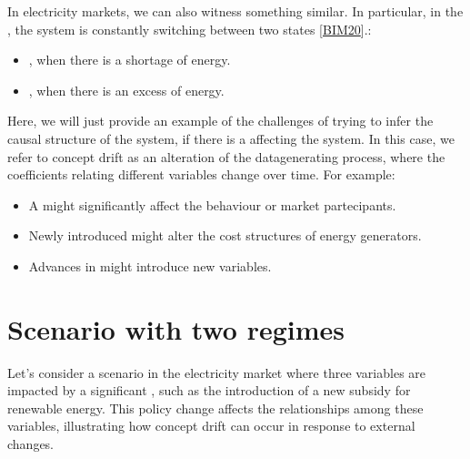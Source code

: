 \documentclass[letterpaper,10pt,english]{jupyterBook}
\begin{document}
\sphinxAtStartPar
In electricity markets, we can also witness something similar. In particular, in the , the system is constantly switching between two states {[}\hyperlink{cite.bibliography:id8}{BIM20}{]}.:
\begin{itemize}
\item {} 
\sphinxAtStartPar
{}, when there is a shortage of energy.

\item {} 
\sphinxAtStartPar
{}, when there is an excess of energy.

\end{itemize}

\sphinxAtStartPar
Here, we will just provide an example of the challenges of trying to infer the causal structure of the system, if there is a  affecting the system. In this case, we refer to concept drift as an alteration of the data\sphinxhyphen{}generating process, where the coefficients relating different variables change over time. For example:
\begin{itemize}
\item {} 
\sphinxAtStartPar
A  might significantly affect the behaviour or market partecipants.

\item {} 
\sphinxAtStartPar
Newly introduced  might alter the cost structures of energy generators.

\item {} 
\sphinxAtStartPar
Advances in  might introduce new variables.

\end{itemize}


\section{Scenario with two regimes}
\label{\detokenize{notebooks/structural_breaks_example:scenario-with-two-regimes}}
\sphinxAtStartPar
Let’s consider a scenario in the electricity market where three variables are impacted by a significant , such as the introduction of a new subsidy for renewable energy. This policy change affects the relationships among these variables, illustrating how concept drift can occur in response to external changes.
\end{document}
